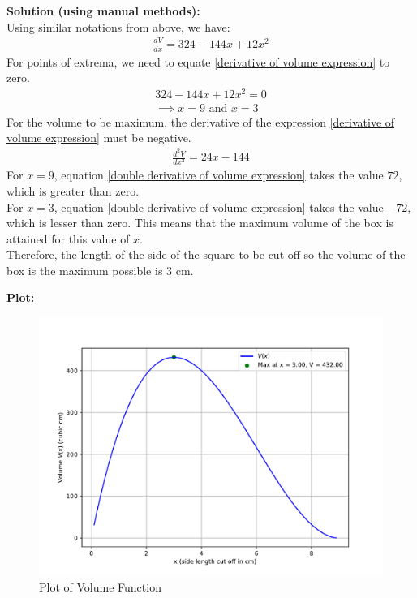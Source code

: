 \documentclass[journal]{IEEEtran}
\begin{document}
\textbf{Solution (using manual methods):} \\
Using similar notations from above, we have:
\begin{align}
\frac{dV}{dx} = 324 - 144x + 12x^2 \label{derivative of volume expression}
\end{align}
For points of extrema, we need to equate \eqref{derivative of volume expression} to zero.
\begin{align}
324 - 144x + 12x^2 = 0 \\
\implies x = 9 \text{ and } x = 3
\end{align}
For the volume to be maximum, the derivative of the expression \eqref{derivative of volume expression} must be negative.
\begin{align}
\frac{d^2V}{dx^2} = 24x - 144 \label{double derivative of volume expression}
\end{align}
For $x=9$, equation \eqref{double derivative of volume expression} takes the value $72$, which is greater than zero. \\
For $x=3$, equation \eqref{double derivative of volume expression} takes the value $-72$, which is lesser than zero. This means that the maximum volume of the box is attained for this value of $x$. \\
Therefore, the length of the side of the square to be cut off so the volume of the box is the maximum possible is $3$ cm.

\newpage

\textbf{Plot:} \\
\begin{figure}[h]
	\centering
	\includegraphics[width=\columnwidth]{figs/fig.pdf}
	\caption{Plot of Volume Function}
\end{figure}
\end{document}
